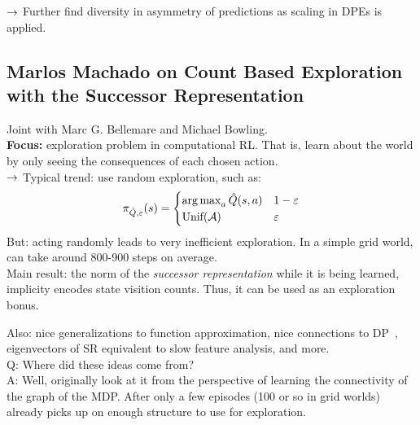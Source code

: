 $\rightarrow$ Further find diversity in asymmetry of predictions as scaling in DPEs is applied.

\spacerule


\subsection{Marlos Machado on Count Based Exploration with the Successor Representation}

Joint with Marc G. Bellemare and Michael Bowling. \\

{\bf Focus:} exploration problem in computational RL. That is, learn about the world by only seeing the consequences of each chosen action. \\

$\rightarrow$ Typical trend: use random exploration, such as:
\[
\pi_{\hat{Q},\varepsilon} (s) = \begin{cases}
\operatorname*{arg\,max}_a \hat{Q}(s,a)& 1-\varepsilon \\
\text{Unif}(\mathcal{A})& \varepsilon \\
\end{cases}
\]
But: acting randomly leads to very inefficient exploration. In a simple grid world, can take around 800-900 steps on average. \\

Main result: the norm of the {\it successor representation} while it is being learned, implicity encodes state visition counts. Thus, it can be used as an exploration bonus.

Also: nice generalizations to function approximation, nice connections to DP~\cite{wang2007dual}, eigenvectors of SR equivalent to slow feature analysis, and more. \\

Q: Where did these ideas come from? \\

A: Well, originally look at it from the perspective of learning the connectivity of the graph of the MDP. After only a few episodes (100 or so in grid worlds) already picks up on enough structure to use for exploration. \\

